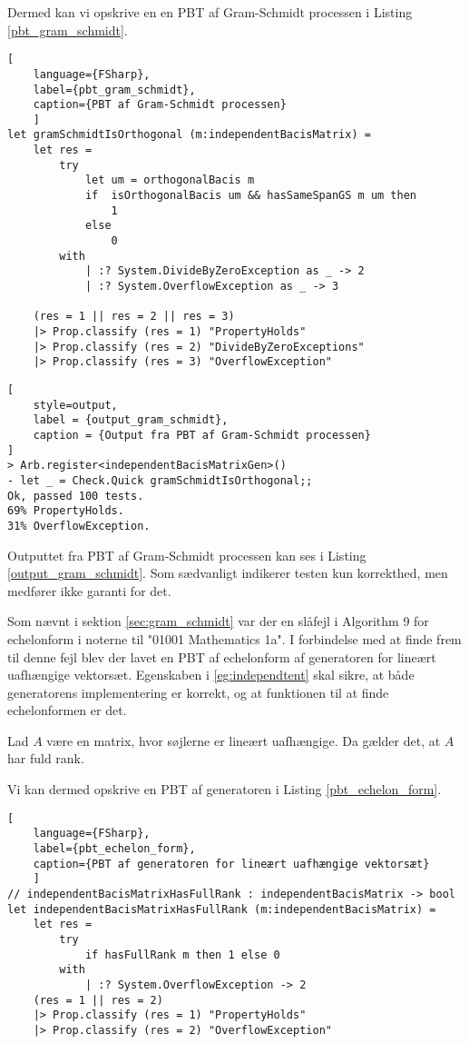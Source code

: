 Dermed kan vi opskrive en en PBT af Gram-Schmidt processen i Listing \ref{pbt_gram_schmidt}.


\begin{lstlisting}[
    language={FSharp}, 
    label={pbt_gram_schmidt}, 
    caption={PBT af Gram-Schmidt processen}
    ]
let gramSchmidtIsOrthogonal (m:independentBacisMatrix) =
    let res =
        try 
            let um = orthogonalBacis m
            if  isOrthogonalBacis um && hasSameSpanGS m um then 
                1 
            else 
                0
        with
            | :? System.DivideByZeroException as _ -> 2
            | :? System.OverflowException as _ -> 3

    (res = 1 || res = 2 || res = 3)
    |> Prop.classify (res = 1) "PropertyHolds"
    |> Prop.classify (res = 2) "DivideByZeroExceptions"
    |> Prop.classify (res = 3) "OverflowException"
\end{lstlisting}

\begin{lstlisting}[
    style=output,
    label = {output_gram_schmidt},
    caption = {Output fra PBT af Gram-Schmidt processen}
]
> Arb.register<independentBacisMatrixGen>()
- let _ = Check.Quick gramSchmidtIsOrthogonal;;
Ok, passed 100 tests.
69% PropertyHolds.
31% OverflowException.
\end{lstlisting}

Outputtet fra PBT af Gram-Schmidt processen kan ses i Listing \ref{output_gram_schmidt}. Som sædvanligt indikerer testen kun korrekthed, men medfører ikke garanti for det.

Som nævnt i sektion \ref{sec:gram_schmidt} var der en slåfejl i Algorithm 9 for echelonform i noterne til "01001 Mathematics 1a". I forbindelse med at finde frem til denne fejl blev der lavet en PBT af echelonform af generatoren for lineært uafhængige vektorsæt. Egenskaben i \ref{eg:independtent} skal sikre, at både generatorens implementering er korrekt, og at funktionen til at finde echelonformen er det.

\vspace{0.5cm}
\begin{egenskab}\label{eg:independtent}
    Lad \( A \) være en matrix, hvor søjlerne er lineært uafhængige. Da gælder det, at \( A \) har fuld rank.
\end{egenskab}

Vi kan dermed opskrive en PBT af generatoren i Listing \ref{pbt_echelon_form}.

\begin{lstlisting}[
    language={FSharp}, 
    label={pbt_echelon_form}, 
    caption={PBT af generatoren for lineært uafhængige vektorsæt}
    ]
// independentBacisMatrixHasFullRank : independentBacisMatrix -> bool
let independentBacisMatrixHasFullRank (m:independentBacisMatrix) =
    let res =
        try 
            if hasFullRank m then 1 else 0
        with
            | :? System.OverflowException -> 2
    (res = 1 || res = 2)
    |> Prop.classify (res = 1) "PropertyHolds"
    |> Prop.classify (res = 2) "OverflowException"
\end{lstlisting}

